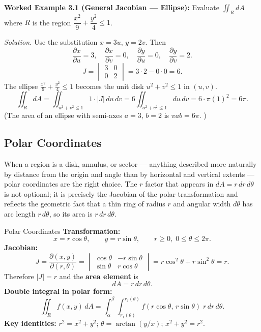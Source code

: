 \documentclass[12pt,a4paper]{article}
\begin{document}
\textbf{Worked Example 3.1 (General Jacobian --- Ellipse):}
Evaluate $\iint_R dA$ where $R$ is the region $\dfrac{x^2}{9} + \dfrac{y^2}{4} \leq 1$.

\textit{Solution.} Use the substitution $x = 3u$, $y = 2v$. Then
\[
  \frac{\partial x}{\partial u} = 3,\quad \frac{\partial x}{\partial v} = 0,\quad
  \frac{\partial y}{\partial u} = 0,\quad \frac{\partial y}{\partial v} = 2.
\]
\[
  J = \begin{vmatrix} 3 & 0 \\ 0 & 2 \end{vmatrix} = 3 \cdot 2 - 0 \cdot 0 = 6.
\]
The ellipse $\tfrac{x^2}{9}+\tfrac{y^2}{4}\leq1$ becomes the unit disk $u^2 + v^2 \leq 1$ in $(u,v)$.
\[
  \iint_R dA = \iint_{u^2+v^2\leq1} 1 \cdot |J|\,du\,dv = 6 \iint_{u^2+v^2\leq1} du\,dv
             = 6 \cdot \pi(1)^2 = 6\pi.
\]
(The area of an ellipse with semi-axes $a=3$, $b=2$ is $\pi ab = 6\pi$. \checkmark)

\subsection{Polar Coordinates}

When a region is a disk, annulus, or sector --- anything described more naturally by distance from
the origin and angle than by horizontal and vertical extents --- polar coordinates are the right
choice. The $r$ factor that appears in $dA = r\,dr\,d\theta$ is not optional; it is precisely the
Jacobian of the polar transformation and reflects the geometric fact that a thin ring of radius $r$
and angular width $d\theta$ has arc length $r\,d\theta$, so its area is $r\,dr\,d\theta$.

\begin{infobox}{Polar Coordinates}
\textbf{Transformation:}
\[
  x = r\cos\theta, \qquad y = r\sin\theta, \qquad r \geq 0,\; 0 \leq \theta \leq 2\pi.
\]
\textbf{Jacobian:}
\[
  J = \frac{\partial(x,y)}{\partial(r,\theta)}
    = \begin{vmatrix} \cos\theta & -r\sin\theta \\ \sin\theta & r\cos\theta \end{vmatrix}
    = r\cos^2\theta + r\sin^2\theta = r.
\]
Therefore $|J| = r$ and the \textbf{area element} is
\[
  dA = r\,dr\,d\theta.
\]
\textbf{Double integral in polar form:}
\[
  \iint_R f(x,y)\,dA = \int_{\alpha}^{\beta}\int_{r_1(\theta)}^{r_2(\theta)}
      f(r\cos\theta,\, r\sin\theta)\; r\,dr\,d\theta.
\]
\textbf{Key identities:} $r^2 = x^2 + y^2$; $\theta = \arctan(y/x)$; $x^2+y^2 = r^2$.
\end{infobox}
\end{document}
